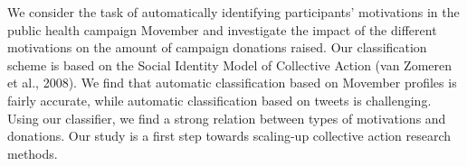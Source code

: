 We consider the task of automatically identifying participants' motivations in the public health campaign Movember and investigate the impact of the different motivations on the amount of campaign donations raised. Our classification scheme is based on the Social Identity Model of Collective Action (van Zomeren et al., 2008). We find that automatic classification based on Movember profiles is fairly accurate, while automatic classification based on tweets is challenging. Using our classifier, we find a strong relation between types of motivations and donations. Our study is a first step towards scaling-up collective action research methods.
